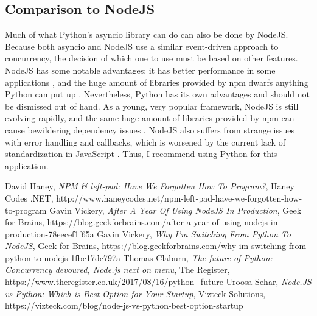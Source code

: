 \documentclass[letterpaper,twocolumn,10pt]{article}
\begin{document}
\subsection{Comparison to NodeJS}
Much of what Python's asyncio library can do can also be done by NodeJS. Because both asyncio and NodeJS use a similar event-driven approach to concurrency, the decision of which one to use must be based on other features. NodeJS has some notable advantages: it has better performance in some applications \cite{viz}, and the huge amount of libraries provided by npm dwarfs anything Python can put up \cite{gfb1}. Nevertheless, Python has its own advantages and should not be dismissed out of hand. As a young, very popular framework, NodeJS is still evolving rapidly, and the same huge amount of libraries provided by npm can cause bewildering dependency issues \cite{leftpad}. NodeJS also suffers from strange issues with error handling and callbacks, which is worsened by the current lack of standardization in JavaScript \cite{gfb2}. Thus, I recommend using Python for this application.

\begin{thebibliography}{9}
David Haney, 
\textit{NPM \& left-pad: Have We Forgotten How To Program?},
Haney Codes .NET,
http://www.haneycodes.net/npm-left-pad-have-we-forgotten-how-to-program
Gavin Vickery,
\textit{After A Year Of Using NodeJS In Production},
Geek for Brains,
https://blog.geekforbrains.com/after-a-year-of-using-nodejs-in-production-78eecef1f65a
Gavin Vickery,
\textit{Why I'm Switching From Python To NodeJS},
Geek for Brains,
https://blog.geekforbrains.com/why-im-switching-from-python-to-nodejs-1fbc17dc797a
Thomas Claburn,
\textit{The future of Python: Concurrency devoured, Node.js next on menu},
The Register, 
https://www.theregister.co.uk/2017/08/16/python\_future
Uroosa Sehar,
\textit{Node.JS vs Python: Which is Best Option for Your Startup},
Vizteck Solutions,
https://vizteck.com/blog/node-js-vs-python-best-option-startup
\end{thebibliography}
\end{document}

